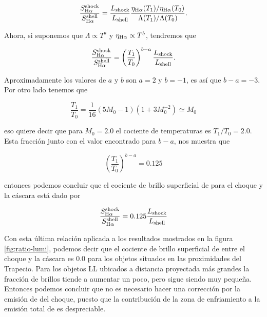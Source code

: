 \begin{equation}
  \label{eq:ratio-bri}
  \frac{S^{\text{shock}}_{\mathrm{H}\alpha}}{S^{\text{shell}}_{\mathrm{H}\alpha}} = \frac{L_{\text{shock}}}{L_{\text{shell}}} \frac{\eta_{\mathrm{H}\alpha}(T_{1})/\eta_{\mathrm{H}\alpha}(T_{0})}{\Lambda(T_{1})/\Lambda(T_{0})}.
\end{equation}

Ahora, si suponemos que \(\Lambda \propto T^{a}\) y \(\eta_{\mathrm{H}\alpha{}} \propto T^{b}\), tendremos que

\begin{equation}
  \label{eq:ratio-brig1}
   \frac{S^{\text{shock}}_{\mathrm{H}\alpha}}{S^{\text{shell}}_{\mathrm{H}\alpha}} = \left(\frac{T_{1}}{T_{0}}\right)^{b-a} \frac{L_{\text{shock}}}{L_{\text{shell}}}. 
\end{equation}

Aproximadamente los valores de \(a\) y \(b\) son \(a = 2\) y \(b = -1\), es así que \(b - a = -3\). Por otro lado tenemos que 

\begin{equation}
  \label{eq:ratio-tem}
  \frac{T_{1}}{T_{0}} = \frac{1}{16}(5M_{0} - 1)(1 + 3M^{-2}_{0}) \simeq M_{0}
\end{equation}

eso quiere decir que para \(M_{0} = 2.0\) el cociente de temperaturas es \(T_{1}/T_{0} = 2.0\). Esta fracción junto con el valor encontrado para \(b-a\), nos muestra que

\begin{equation*}
  \label{eq:ratio-temp2}
   \left(\frac{T_{1}}{T_{0}}\right)^{b-a} = 0.125 
\end{equation*}

entonces podemos concluir que el cociente de brillo superficial de \ha{} para el choque y la cáscara está dado por

\begin{equation}
  \label{eq:ratio-b}
   \frac{S^{\text{shock}}_{\mathrm{H}\alpha}}{S^{\text{shell}}_{\mathrm{H}\alpha}} = 0.125 \frac{L_{\text{shock}}}{L_{\text{shell}}}
\end{equation}

Con esta última relación aplicada a los resultados mostrados en la figura \ref{fig:ratio-lumi}, podemos decir que el cociente de brillo superficial de \ha{} entre el choque y la cáscara es 0.0 para los objetos situados en las proximidades del Trapecio. Para los objetos LL ubicados a distancia proyectada más grandes la fracción de brillos tiende a aumentar un poco, pero sigue siendo muy pequeña. Entonces podemos concluir que no es necesario hacer una corrección por la emisión de \ha{} del choque, puesto que la contribución de la zona de enfriamiento a la emisión total de \ha{} es despreciable.\\   



